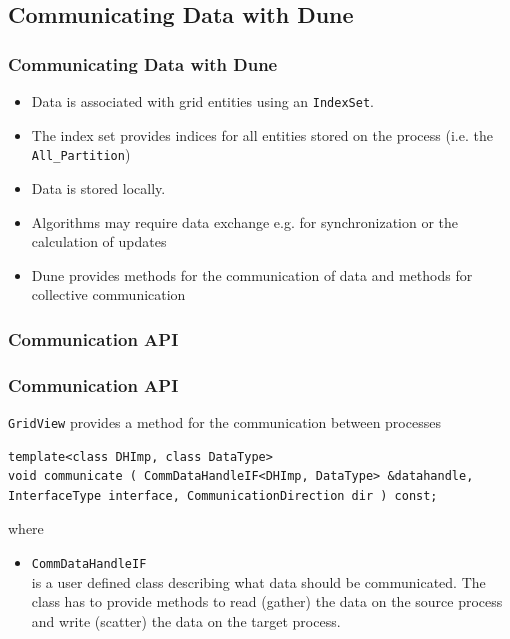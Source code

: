 \subsection{Communicating Data with Dune}
\begin{frame}[fragile]
  \frametitle<presentation>{Communicating Data with Dune}


  \begin{itemize}
  \item Data is associated with grid entities using an \texttt{IndexSet}.
  \item The index set provides indices for all entities stored on the process (i.e. the \texttt{All\_Partition})
  \item Data is stored locally.
  \item Algorithms may require data exchange e.g. for synchronization or the calculation of updates 
  \item Dune provides methods for the communication of data and methods for collective communication
  \end{itemize}

\end{frame}

\subsubsection{Communication API}
\begin{frame}[fragile]
  \frametitle<presentation>{Communication API}

  \texttt{GridView} provides a method for the communication between processes
    \begin{lstlisting}
template<class DHImp, class DataType>
void communicate ( CommDataHandleIF<DHImp, DataType> &datahandle, InterfaceType interface, CommunicationDirection dir ) const;
    \end{lstlisting}
where
    \begin{itemize}
    \item \lstinline!CommDataHandleIF!\\
      is a user defined class describing what data should be communicated. The class has to provide methods to read (gather) the data on the
      source process and write (scatter) the data on the target process.
    \end{itemize}
\end{frame}


